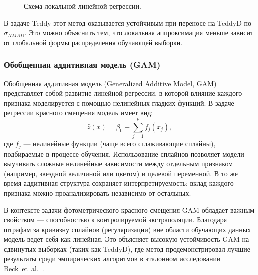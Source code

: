 \documentclass[12pt,a4paper]{article}
\begin{document}
\begin{figure}[h]
\centering
{}
\caption{Схема локальной линейной регрессии.}
\label{fig:llr-scheme}
\end{figure}

В задаче Teddy этот метод оказывается устойчивым при переносе на TeddyD по $\sigma_{NMAD}$. Это можно объяснить тем, что локальная аппроксимация меньше зависит от глобальной формы распределения обучающей выборки.

\subsubsection{Обобщенная аддитивная модель (GAM)}

Обобщенная аддитивная модель (Generalized Additive Model, GAM) представляет собой развитие линейной регрессии, в которой влияние каждого признака моделируется с помощью нелинейных гладких функций. В задаче регрессии красного смещения модель имеет вид:
\begin{equation}
\hat{z}(x) = \beta_0 + \sum_{j=1}^{p} f_j(x_j),
\end{equation}
где $f_j$ — нелинейные функции (чаще всего сглаживающие сплайны), подбираемые в процессе обучения. Использование сплайнов позволяет модели выучивать сложные нелинейные зависимости между отдельным признаком (например, звездной величиной или цветом) и целевой переменной. В то же время аддитивная структура сохраняет интерпретируемость: вклад каждого признака можно проанализировать независимо от остальных.

В контексте задачи фотометрического красного смещения GAM обладает важным свойством — способностью к контролируемой экстраполяции. Благодаря штрафам за кривизну сплайнов (регуляризации) вне области обучающих данных модель ведет себя как линейная. Это объясняет высокую устойчивость GAM на сдвинутых выборках (таких как TeddyD), где метод продемонстрировал лучшие результаты среди эмпирических алгоритмов в эталонном исследовании Beck~et~al.~\cite{beck2017}.
\end{document}
